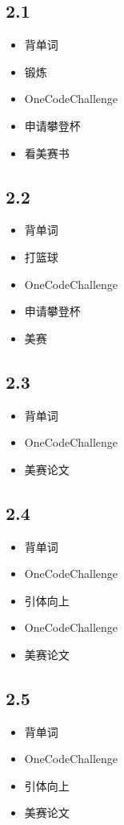 \documentclass[UTF8]{ctexart}
\begin{document}
\subsection*{2.1}
\begin{itemize}
    \item 背单词
    \item 锻炼
    \item OneCodeChallenge
    \item 申请攀登杯
    \item 看美赛书
\end{itemize}

\subsection*{2.2}
\begin{itemize}
    \item 背单词
    \item 打篮球
    \item OneCodeChallenge
    \item 申请攀登杯
    \item 美赛
\end{itemize}

\subsection*{2.3}
\begin{itemize}
    \item 背单词
    \item OneCodeChallenge
    \item 美赛论文
\end{itemize}

\subsection*{2.4}
\begin{itemize}
    \item 背单词
    \item OneCodeChallenge
    \item 引体向上
    \item OneCodeChallenge
    \item 美赛论文
\end{itemize}

\subsection*{2.5}
\begin{itemize}
    \item 背单词
    \item OneCodeChallenge
    \item 引体向上
    \item 美赛论文
\end{itemize}
\end{document}
